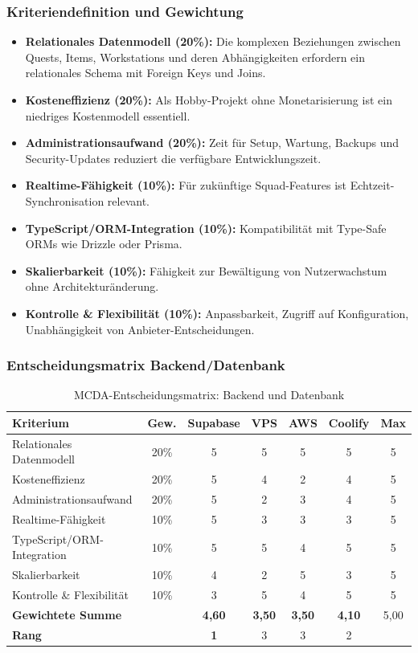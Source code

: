 \subsubsection{Kriteriendefinition und Gewichtung}

\begin{itemize}
    \item \textbf{Relationales Datenmodell (20\%):} Die komplexen Beziehungen zwischen Quests, Items, Workstations und deren Abhängigkeiten erfordern ein relationales Schema mit Foreign Keys und Joins.
    \item \textbf{Kosteneffizienz (20\%):} Als Hobby-Projekt ohne Monetarisierung ist ein niedriges Kostenmodell essentiell.
    \item \textbf{Administrationsaufwand (20\%):} Zeit für Setup, Wartung, Backups und Security-Updates reduziert die verfügbare Entwicklungszeit.
    \item \textbf{Realtime-Fähigkeit (10\%):} Für zukünftige Squad-Features ist Echtzeit-Synchronisation relevant.
    \item \textbf{TypeScript/ORM-Integration (10\%):} Kompatibilität mit Type-Safe ORMs wie Drizzle oder Prisma.
    \item \textbf{Skalierbarkeit (10\%):} Fähigkeit zur Bewältigung von Nutzerwachstum ohne Architekturänderung.
    \item \textbf{Kontrolle \& Flexibilität (10\%):} Anpassbarkeit, Zugriff auf Konfiguration, Unabhängigkeit von Anbieter-Entscheidungen.
\end{itemize}

\subsubsection{Entscheidungsmatrix Backend/Datenbank}

\begin{table}[htbp]
\centering
\caption{MCDA-Entscheidungsmatrix: Backend und Datenbank}
\label{tab:mcda-backend}
\begin{tabular}{lc|cccc|c}
\toprule
\textbf{Kriterium} & \textbf{Gew.} & \textbf{Supabase} & \textbf{VPS} & \textbf{AWS} & \textbf{Coolify} & \textbf{Max} \\
\midrule
Relationales Datenmodell & 20\% & 5 & 5 & 5 & 5 & 5 \\
Kosteneffizienz & 20\% & 5 & 4 & 2 & 4 & 5 \\
Administrationsaufwand & 20\% & 5 & 2 & 3 & 4 & 5 \\
Realtime-Fähigkeit & 10\% & 5 & 3 & 3 & 3 & 5 \\
TypeScript/ORM-Integration & 10\% & 5 & 5 & 4 & 5 & 5 \\
Skalierbarkeit & 10\% & 4 & 2 & 5 & 3 & 5 \\
Kontrolle \& Flexibilität & 10\% & 3 & 5 & 4 & 5 & 5 \\
\midrule
\textbf{Gewichtete Summe} & & \textbf{4,60} & \textbf{3,50} & \textbf{3,50} & \textbf{4,10} & 5,00 \\
\textbf{Rang} & & \textbf{1} & 3 & 3 & 2 & \\
\bottomrule
\end{tabular}
\end{table}

